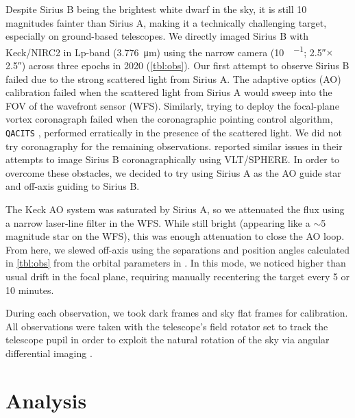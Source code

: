 \documentclass[twocolumn]{aastex631}
\begin{document}
Despite Sirius B being the brightest white dwarf in the sky, it is still 10 magnitudes fainter than Sirius A, making it a technically challenging target, especially on ground-based telescopes. We directly imaged Sirius B with Keck/NIRC2 in Lp-band (\qty{3.776}{\micro\meter}) using the narrow camera (\qty{10}{\milliarcsecond\per\pixel}; \ang{;;2.5}$\times$\ang{;;2.5}) across three epochs in 2020 (\cref{tbl:obs}). Our first attempt to observe Sirius B failed due to the strong scattered light from Sirius A. The adaptive optics (AO) calibration failed when the scattered light from Sirius A would sweep into the FOV of the wavefront sensor (WFS). Similarly, trying to deploy the focal-plane vortex coronagraph \citep{serabyn_w_2017} failed when the coronagraphic pointing control algorithm, \texttt{QACITS} \citep{huby_w_2017}, performed erratically in the presence of the scattered light. We did not try coronagraphy for the remaining observations. \citet[\S2]{vigan_high-contrast_2015} reported similar issues in their attempts to image Sirius B coronagraphically using VLT/SPHERE. In order to overcome these obstacles, we decided to try using Sirius A as the AO guide star and off-axis guiding to Sirius B.

The Keck AO system \citep{wizinowich_performance_2000} was saturated by Sirius A, so we attenuated the flux using a narrow laser-line filter in the WFS. While still bright (appearing like a $\sim$5 magnitude star on the WFS), this was enough attenuation to close the AO loop. From here, we slewed off-axis using the separations and position angles calculated in \cref{tbl:obs} from the orbital parameters in \citet{bond_sirius_2017}. In this mode, we noticed higher than usual drift in the focal plane, requiring manually recentering the target every 5 or 10 minutes.

During each observation, we took dark frames and sky flat frames for calibration. All observations were taken with the telescope's field rotator set to track the telescope pupil in order to exploit the natural rotation of the sky via angular differential imaging \citep[ADI;][]{marois_angular_2006}.

\section{Analysis} \label{sec:analysis}
\end{document}
